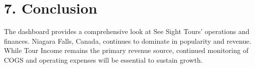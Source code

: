 \documentclass[12pt]{article}
\begin{document}
\section*{7. Conclusion}
The dashboard provides a comprehensive look at See Sight Tours’ operations and finances. Niagara Falls, Canada, continues to dominate in popularity and revenue. While Tour Income remains the primary revenue source, continued monitoring of COGS and operating expenses will be essential to sustain growth.
\end{document}
